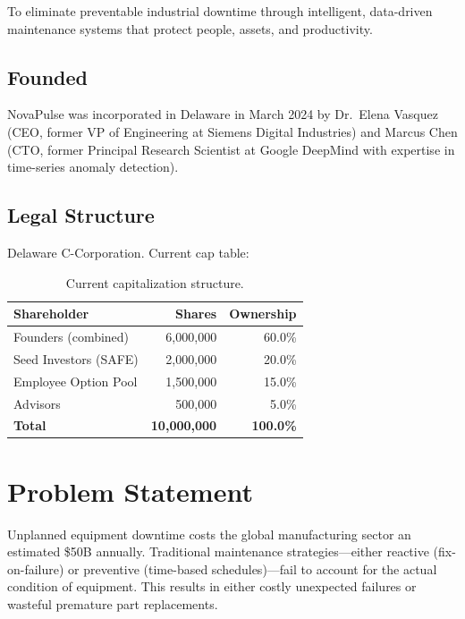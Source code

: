 \documentclass[
    language=english,
    doctype=business-plan,
    institution=none,
]{../../omnilatex}
\begin{document}
To eliminate preventable industrial downtime through intelligent, data-driven
maintenance systems that protect people, assets, and productivity.

\subsection{Founded}

NovaPulse was incorporated in Delaware in March 2024 by Dr.\ Elena Vasquez
(CEO, former VP of Engineering at Siemens Digital Industries) and Marcus Chen
(CTO, former Principal Research Scientist at Google DeepMind with expertise in
time-series anomaly detection).

\subsection{Legal Structure}

Delaware C-Corporation. Current cap table:

\begin{table}[h]
    \centering
    \begin{tabular}{lrr}
        \toprule
        \textbf{Shareholder} & \textbf{Shares} & \textbf{Ownership} \\
        \midrule
        Founders (combined)     & 6,000,000 & 60.0\% \\
        Seed Investors (SAFE)   & 2,000,000 & 20.0\% \\
        Employee Option Pool    & 1,500,000 & 15.0\% \\
        Advisors                &   500,000 &  5.0\% \\
        \midrule
        \textbf{Total}          & \textbf{10,000,000} & \textbf{100.0\%} \\
        \bottomrule
    \end{tabular}
    \caption{Current capitalization structure.}
\end{table}

\section{Problem Statement}

Unplanned equipment downtime costs the global manufacturing sector an estimated
\$50B annually. Traditional maintenance strategies---either reactive
(fix-on-failure) or preventive (time-based schedules)---fail to account for
the actual condition of equipment. This results in either costly unexpected
failures or wasteful premature part replacements.
\end{document}
